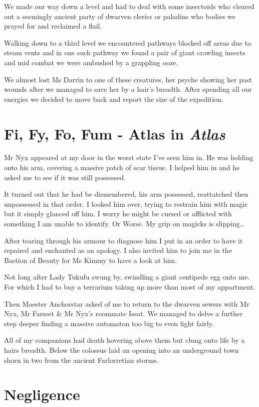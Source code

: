 \documentclass{article}
\begin{document}
We made our way down a level and had to deal with some insectoids who cleared out a seemingly ancient party of dwarven clerics or paladins who bodies we prayed for and reclaimed a flail.

Walking down to a third level we encountered pathways blocked off areas due to steam vents and in one such pathway we found a pair of giant crawling insects and mid combat we were ambushed by a grappling ooze.

We almost lost Ms Darrin to one of these creatures, her psyche showing her past wounds after we managed to save her by a hair's breadth. After spending all our energies we decided to move back and report the size of the expedition.

\section*{Fi, Fy, Fo, Fum - Atlas in \textit{Atlas}}

Mr Nyx appeared at my door in the worst state I've seen him in. He was holding onto his arm, covering a massive patch of scar tissue. I helped him in and he asked me to see if it was still possessed.

It turned out that he had be dismembered, his arm possessed, reattatched then unpossessed in that order. I looked him over, trying to restrain him with magic but it simply glanced off him. I worry he might be cursed or afflicted with something I am unable to identify. Or Worse. My grip on magicks is slipping\dots

After tearing through his armour to diagnose him I put in an order to have it repaired and enchanted as an apology. I also invited him to join me in the Bastion of Beauty for Ms Kimmy to have a look at him.

Not long after Lady Tukufu swung by, swindling a giant centipede egg onto me. For which I had to buy a terrarium taking up more than most of my appartment.

Then Maester Anchorstar asked of me to return to the dwarven sewers with Mr Nyx, Mr Farsset \& Mr Nyx's roommate Issat. We managed to delve a further step deeper finding a massive automaton too big to even fight fairly.

All of my companions had death hovering above them but clung onto life by a hairs breadth. Below the colossus laid an opening into an underground town shorn in two from the ancient Farlorretian storms.

\section*{Negligence}
\end{document}
